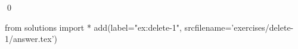 
\begin{ex} 
  \label{ex:delete-1}
  
  \qed
\end{ex} 
\begin{python0}
from solutions import *
add(label="ex:delete-1",
    srcfilename='exercises/delete-1/answer.tex') 
\end{python0}
